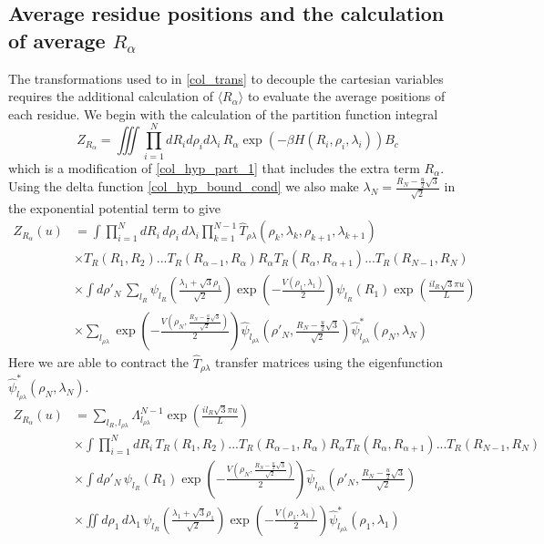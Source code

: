 \subsection{Average residue positions and the calculation of average $R_{\alpha}$}
%
The transformations used to in \eqref{col_trans} to decouple the cartesian variables requires the additional calculation of $\langle R_{\alpha} \rangle$ to evaluate the average positions of each residue.  We begin with the calculation of the partition function integral  
%
\begin{equation}
\label{col_mxd_r_lambda}
Z_{R_\alpha}=\iiint \prod^{N}_{i=1}dR_{i}d\rho_{i}d\lambda_{i}\,R_{\alpha}\exp\left(-\beta H\left(R_{i},\rho_{i},\lambda_{i}\right)\right)B_c
\end{equation}
%
which is a modification of \eqref{col_hyp_part_1} that includes the extra term $R_{\alpha}$. Using the delta function \eqref{col_hyp_bound_cond} we also make $\lambda_{N}=\frac{R_N-\frac{u}{2}\sqrt{3}}{\sqrt{2}}$ in the exponential potential term to give
%
\begin{align}\label{col_mxd_r_1}
Z_{R_{\alpha}} \left(u\right)&=\int\prod^{N}_{i=1}dR_i\,d\rho_i\,d\lambda_i\prod^{N-1}_{k=1}\hat{T}_{\rho\lambda}(\rho_k,\lambda_k,\rho_{k+1},\lambda_{k+1})\nonumber\\
&\times T_{R}(R_1,R_{2})...T_{R}(R_{\alpha-1},R_{\alpha})R_{\alpha}T_{R}(R_{\alpha},R_{\alpha+1})...T_{R}(R_{N-1},R_{N})\nonumber\\
&\times\int d\rho'_N\,\sum_{l_R}\psi_{l_R}\left(\frac{\lambda_1 + \sqrt{3}\rho_1}{\sqrt{2}}\right)\exp\left(-\frac{V\left(\rho_{1},\lambda_{1}\right)}{2}\right)\psi_{l_R}\left(R_{1}\right)\exp\left(\frac{il_R\sqrt{3}\pi u}{L}\right)\nonumber\\ 
&\times\sum_{l_{\rho\lambda}}\exp\left(-\frac{V\left(\rho_{N},\frac{R_N-\frac{u}{2}\sqrt{3}}{\sqrt{2}}\right)}{2}\right)\hat{\psi}_{l_{\rho\lambda}}\left(\rho'_{N},\frac{R_N-\frac{u}{2}\sqrt{3}}{\sqrt{2}}\right)\hat{\psi}^{*}_{l_{\rho\lambda}}\left(\rho_{N},\lambda_{N}\right)
\end{align}
%
Here we are able to contract the $\hat{T}_{\rho\lambda}$ transfer matrices using the eigenfunction $\hat{\psi}^{*}_{l_{\rho\lambda}}\left(\rho_{N},\lambda_{N}\right)$. 
%
\begin{align}\label{col_mxd_r_2}
Z_{R_{\alpha}} \left(u\right)&=\sum_{l_R,l_{\rho\lambda}}\Lambda_{l_{\rho\lambda}}^{N-1}\exp\left(\frac{il_{R}\sqrt{3}\pi u}{L}\right)\nonumber\\
&\times\int\prod^{N}_{i=1}dR_i\,T_{R}(R_1,R_{2})...T_{R}(R_{\alpha-1},R_{\alpha})R_{\alpha}T_{R}(R_{\alpha},R_{\alpha+1})...T_{R}(R_{N-1},R_{N})\nonumber\\
&\times\int d\rho'_N\,\psi_{l_R}\left(R_{1}\right)\exp\left(-\frac{V\left(\rho_{N},\frac{R_N-\frac{u}{2}\sqrt{3}}{\sqrt{2}}\right)}{2}\right)\hat{\psi}_{l_{\rho\lambda}}\left(\rho'_{N},\frac{R_N-\frac{u}{2}\sqrt{3}}{\sqrt{2}}\right)\nonumber\\
&\times\iint d\rho_1\,d\lambda_1\,\psi_{l_R}\left(\frac{\lambda_1 + \sqrt{3}\rho_1}{\sqrt{2}}\right)\exp\left(-\frac{V\left(\rho_{1},\lambda_{1}\right)}{2}\right)\hat{\psi}^{*}_{l_{\rho\lambda}}\left(\rho_{1},\lambda_{1}\right)
\end{align}
